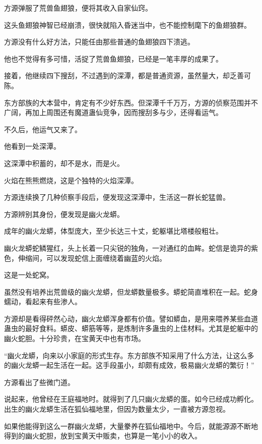 
\begin{this_body}



方源弹服了荒兽鱼翅狼，便将其收入自家仙窍。

这头鱼翅狼神智已经崩溃，很快就陷入昏迷当中，也不能控制麾下的鱼翅狼群。

方源没有什么好方法，只能任由那些普通的鱼翅狼四下溃逃。

他也不觉得有多可惜，活捉了荒兽鱼翅狼，已经是一笔丰厚的成果了。

接着，他继续四下搜刮，不过遇到的深潭，都是普通资源，虽然量大，却乏善可陈。

东方部族的大本营中，肯定有不少好东西。但深潭千千万万，方源的侦察范围并不广阔，再加上周围还有魔道蛊仙竞争，因而搜刮多与少，还得看运气。

不久后，他运气又来了。

他看到一处深潭。

这深潭中积蓄的，却不是水，而是火。

火焰在熊熊燃烧，这是个独特的火焰深潭。

方源连续换了几种侦察手段后，便发现这深潭中，生活这一群长蛇猛兽。

方源辨别其身份，便发现是幽火龙蟒。

成年的幽火龙蟒，体型庞大，至少长达三十丈，蛇躯堪比塔楼般粗壮。

幽火龙蟒蛇鳞猩红，头上长着一只尖锐的独角，一对通红的血眸。蛇信是诡异的紫色，伸缩间，可以发现蛇信上面缠绕着幽蓝的火焰。

这是一处蛇窝。

虽然没有培养出荒兽级的幽火龙蟒，但龙蟒数量极多。蟒蛇简直堆积在一起。蛇身蠕动，看起来有些渗人。

方源却是看得砰然心动，幽火龙蟒浑身都有价值。譬如蟒血，是用来喂养某些血道蛊虫的最好食料。蟒皮、蟒筋等等，是炼制许多蛊虫的上佳材料。尤其是蛇躯中的幽火蛇胆。十分珍贵，在宝黄天中也有市场。

“幽火龙蟒，向来以小家庭的形式生存。东方部族不知采用了什么方法，让这么多的幽火龙蟒一起生活在一起。这手段虽小，却颇有成效，极易幽火龙蟒的繁衍！”

方源看出了些微门道。

说起来，他曾经在王庭福地时。就得到了几只幽火龙蟒的蛋。如今已经成功孵化。出生的幽火龙蟒生活在狐仙福地里，但因为数量太少，一直被方源忽视。

如果他能得到这么一群幽火龙蟒，大量豢养在狐仙福地中。今后，就能源源不断地得到的幽火蛇胆，放到宝黄天中贩卖，也算是一笔小小的收入。


\end{this_body}
